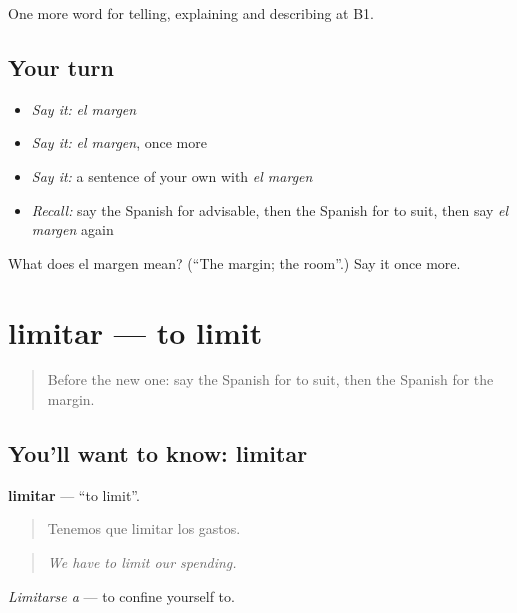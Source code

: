 \begin{grammarlens}[title={What you've built}]
One more word for telling, explaining and describing at B1.
\end{grammarlens}

\subsection*{Your turn}
\begin{itemize}
\raggedright
  \item \emph{Say it:} \emph{el margen}
  \item \emph{Say it:} \emph{el margen}, once more
  \item \emph{Say it:} a sentence of your own with \emph{el margen}
  \item \emph{Recall:} say the Spanish for advisable, then the Spanish for to suit, then say \emph{el margen} again
\end{itemize}

\begin{tcolorbox}[breakable,colback=teal!4,colframe=teal!35!black,title={Before you move on}]
What does el margen mean? (\textquotedblleft{}The margin; the room\textquotedblright{}.) Say it once more.
\end{tcolorbox}
\section[limitar]{limitar — to limit}

\label{lesson:ES-C638-limitar}



\begin{quote}
Before the new one: say the Spanish for to suit, then the Spanish for the margin.
\end{quote}

\subsection*{You'll want to know: limitar}
\textbf{limitar} — \textquotedblleft{}to limit\textquotedblright{}.

\begin{quote}
Tenemos que limitar los gastos.
\end{quote}

\begin{quote}
\emph{We have to limit our spending.}
\end{quote}

\emph{Limitarse a} — to confine yourself to.


